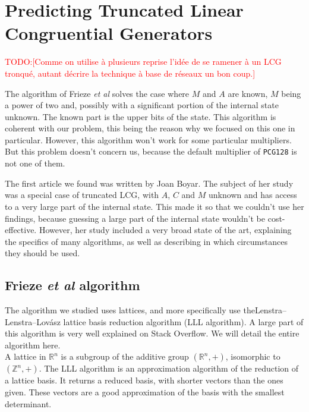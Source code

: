 \documentclass[preprint]{iacrtrans}
\newcommand{\todo}[1]{\textcolor{red}{TODO:[#1]}}
\begin{document}
\section{Predicting Truncated Linear Congruential Generators}

\todo{Comme on utilise à plusieurs reprise l'idée de se ramener à un LCG
  tronqué, autant décrire la technique à base de réseaux un bon coup.}

The algorithm of Frieze \textit{et al}\cite{Frieze} solves the case where $M$
and $A$ are known, $M$ being a power of two and, possibly with a significant
portion of the internal state unknown. The known part is the upper bits of the
state. This algorithm is coherent with our problem, this being the reason why we
focused on this one in particular. However, this algorithm won't work for some
particular multipliers. But this problem doesn't concern us, because the default
multiplier of \texttt{PCG128} is not one of them.

The first article we found was written by Joan Boyar\cite{Boyar1989}. The
subject of her study was a special case of truncated LCG, with $A$, $C$ and $M$
unknown and has access to a very large part of the internal state. This made it
so that we couldn't use her findings, because guessing a large part of the
internal state wouldn't be cost-effective. However, her study included a very
broad state of the art, explaining the specifics of many algorithms, as well as
describing in which circumstances they should be used.



\subsection{Frieze \textit{et al} algorithm}

The algorithm we studied uses lattices, and more specifically use the\break Lenstra–Lenstra–Lovász lattice basis reduction algorithm (LLL algorithm)\cite{LLLpastack}. A large part of this algorithm is very well explained on Stack Overflow\cite{LLLstack}.
We will detail the entire algorithm here.\\

A lattice in $\mathbb{R}^n$ is a subgroup of the additive group $(\mathbb{R}^n,+)$, isomorphic to $(\mathbb{Z}^n,+)$. The LLL algorithm is an approximation algorithm of the reduction of a lattice basis. It returns a reduced basis, with shorter vectors than the ones given. These vectors are a good approximation of the basis with the smallest determinant.\\
\end{document}
